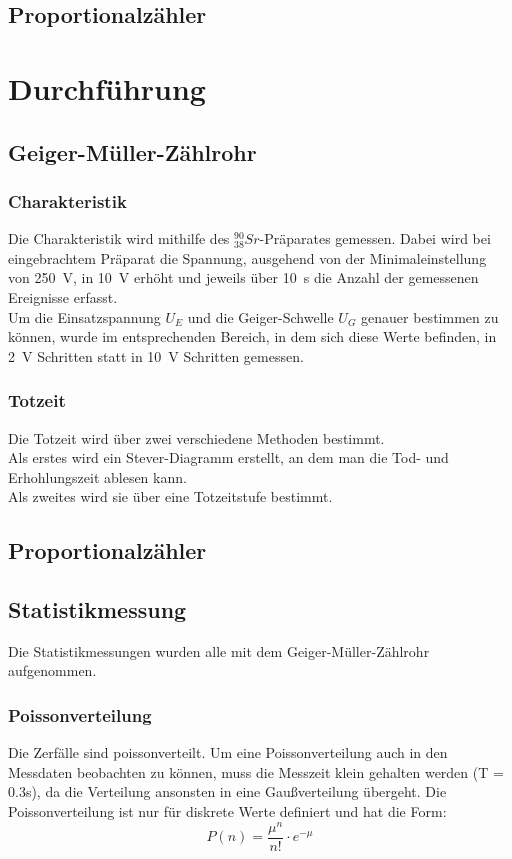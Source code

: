 \documentclass[12pt,a4paper]{article}
\begin{document}
\subsection{Proportionalzähler}

\section{Durchführung}
\subsection{Geiger-Müller-Zählrohr}
\subsubsection{Charakteristik}
Die Charakteristik wird mithilfe des $_{38}^{90}Sr$-Präparates gemessen. Dabei wird bei eingebrachtem Präparat die Spannung, ausgehend von der Minimaleinstellung von \SI{250}{V}, in \SI{10}{V} erhöht und jeweils über \SI{10}{s} die Anzahl der gemessenen Ereignisse erfasst.\\
Um die Einsatzspannung $U_E$ und die Geiger-Schwelle $U_G$ genauer bestimmen zu können, wurde im entsprechenden Bereich, in dem sich diese Werte befinden, in \SI{2}{V} Schritten statt in \SI{10}{V} Schritten gemessen.
\subsubsection{Totzeit}
Die Totzeit wird über zwei verschiedene Methoden bestimmt.\\
Als erstes wird ein Stever-Diagramm erstellt, an dem man die Tod- und Erhohlungszeit ablesen kann.\\
Als zweites wird sie über eine Totzeitstufe bestimmt.
\subsection{Proportionalzähler}
\subsection{Statistikmessung}
Die Statistikmessungen wurden alle mit dem Geiger-Müller-Zählrohr aufgenommen.
\subsubsection{Poissonverteilung}
Die Zerfälle sind poissonverteilt. Um eine Poissonverteilung auch in den Messdaten beobachten zu können, muss die Messzeit klein gehalten werden (T = 0.3s), da die Verteilung ansonsten in eine Gaußverteilung übergeht. Die Poissonverteilung ist nur für diskrete Werte definiert und hat die Form:
\begin{equation}
P(n) = \dfrac{\mu ^n}{n!} \cdot e^{-\mu}
\end{equation}
\end{document}
